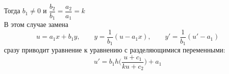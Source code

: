 \begin{enumerate}
\begin{itemize}
        \begin{figure}[!h]
        \end{figure} \\
        Тогда $ b_1 \ne 0 $ и $ \dfrac{b_2}{b_1} = \dfrac{a_2}{a_1} = k $ \\
        В этом случае замена
        $$ u = a_1x + b_1y, \qquad y = \frac1{b_1}(u - a_1x), \qquad y' = \frac1{b_1}(u' - a_1) $$
        сразу приводит уравнение к уравнению с разделяющимися переменными:
        $$ u' = b_1h \bigg( \frac{u + c_1}{ku + c_2} \bigg) + a_1 $$
    \end{itemize}
\end{enumerate}

